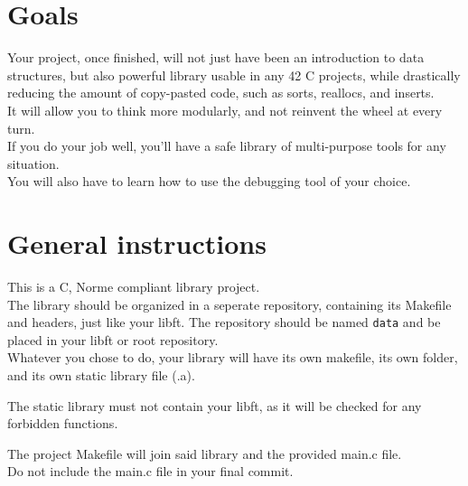 \documentclass{42-en}
\begin{document}
\chapter{Goals}

    Your project, once finished, will not just have been an introduction to data structures,
    but also powerful library usable in any 42 C projects, while drastically reducing
    the amount of copy-pasted code, such as sorts, reallocs, and inserts.\\

    It will allow you to think more modularly, and not reinvent the wheel at every turn.\\

    If you do your job well, you'll have a safe library of multi-purpose tools for any situation.\\

    You will also have to learn how to use the debugging tool of your choice.

\chapter{General instructions}

    This is a C, Norme compliant library project.\\

    The library should be organized in a seperate repository, containing its
    Makefile and headers, just like your libft. The repository should be
    named \texttt{data} and be placed in your libft or root repository.\\

    Whatever you chose to do, your library will have its own makefile,
    its own folder, and its own static library file (.a).
    
    The static library must not contain your libft, as it will be checked for
    any forbidden functions.
    
    The project Makefile will join said library and the provided main.c file.\\

    Do not include the main.c file in your final commit.\\
\end{document}
